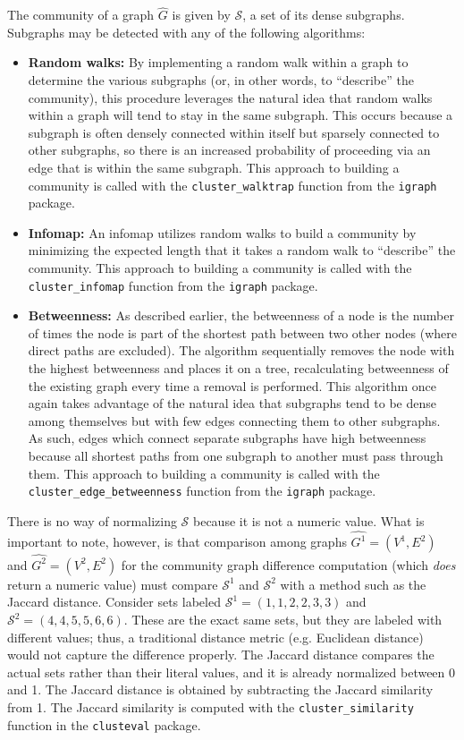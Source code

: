 The community of a graph $\hat{G}$ is given by $\mathcal{S}$, a set of its 
dense subgraphs. Subgraphs may be detected with any of the following algorithms:

\tablespacing
\begin{itemize}
	\item \textbf{Random walks:} By implementing a random walk within a graph 
	to determine the various subgraphs (or, in other words, to ``describe'' the 
	community), this procedure leverages the natural idea 
	that random walks within a graph will tend to stay in the same subgraph. 
	This occurs because a subgraph is often densely connected within itself but 
	sparsely connected to other subgraphs, so there is an increased probability 
	of proceeding via an edge that is within the same subgraph.
	This approach to building a community is called with the 
	\texttt{cluster\_walktrap} function from the \texttt{igraph} package.	
	
	\item \textbf{Infomap:} An infomap utilizes random walks to build a 
	community by minimizing the expected length that it takes a random walk 
	to ``describe'' the community.
	This approach to building a community is called with the 
	\texttt{cluster\_infomap} function from the \texttt{igraph} package.
	
	\item \textbf{Betweenness:} As described earlier, the betweenness of a node 
	is the number of times the node is part of the shortest path between two 
	other nodes (where direct paths are excluded). The algorithm sequentially 
	removes the node with the highest betweenness and places it on a tree, 
	recalculating betweenness of the existing graph every time a removal is 
	performed. This algorithm once again takes advantage of the natural idea 
	that subgraphs tend to be dense among themselves but with few edges 
	connecting them to other subgraphs. As such, edges which connect separate 
	subgraphs have high betweenness because all shortest paths from one 
	subgraph to another must pass through them. 
	This approach to building a community is called with the 
	\texttt{cluster\_edge\_betweenness} function from the \texttt{igraph} 
	package.
\end{itemize}
\bodyspacing

There is no way of normalizing $\mathcal{S}$ because it is not a numeric 
value. What is important to note, however, is that comparison among 
graphs $\hat{G^1}=(V^1,E^2)$ and $\hat{G^2}=(V^2,E^2)$ for the community graph 
difference computation (which \textit{does} return a numeric value)
must compare $\mathcal{S}^1$ and $\mathcal{S}^2$ with a method such as the 
Jaccard distance. Consider sets labeled $\mathcal{S}^1=(1,1,2,2,3,3)$ and 
$\mathcal{S}^2=(4,4,5,5,6,6)$. These are the exact same sets, but 
they are labeled with different values; thus, a traditional distance metric 
(e.g. Euclidean distance) would not capture the difference properly. 
The Jaccard distance compares the actual sets rather than their literal values, 
and it is already normalized between 0 and 1.
The Jaccard distance is obtained by subtracting the Jaccard similarity from 1. 
The Jaccard similarity is computed with the \texttt{cluster\_similarity} 
function in the \texttt{clusteval} package.


